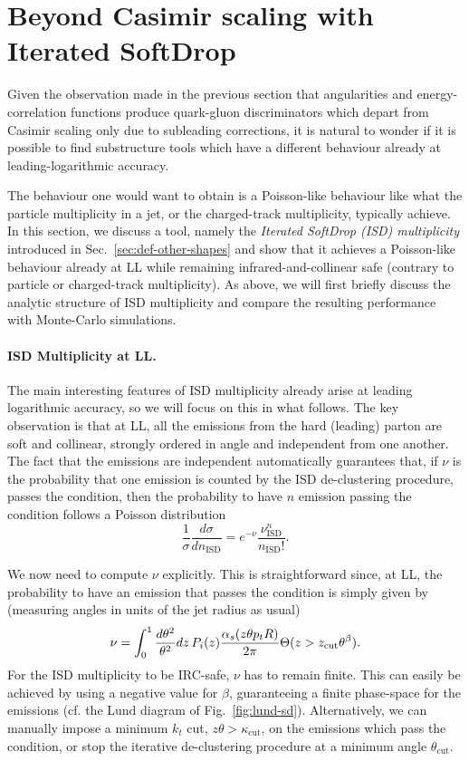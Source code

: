 \section{Beyond Casimir scaling with Iterated SoftDrop}\label{sec:isd}

Given the observation made in the previous section that angularities
and energy-cor\-relation functions produce quark-gluon discriminators
which depart from Casimir scaling only due to subleading corrections,
it is natural to wonder if it is possible to find substructure tools
which have a different behaviour already at leading-logarithmic
accuracy.

The behaviour one would want to obtain is a Poisson-like
behaviour like what the particle multiplicity in a jet, or the
charged-track multiplicity, typically achieve.
%
In this section, we discuss a tool, namely the {\em Iterated SoftDrop (ISD)
  multiplicity} introduced in Sec.~\ref{sec:def-other-shapes} and
show that it achieves a Poisson-like behaviour already at LL while
remaining infrared-and-collinear safe (contrary to particle or
charged-track multiplicity).
%
As above, we will first briefly discuss the analytic structure of ISD
multiplicity and compare the resulting performance with Monte-Carlo
simulations.

\paragraph{ISD Multiplicity at LL.}
%
The main interesting features of ISD multiplicity already arise at
leading logarithmic accuracy, so we will focus on this in what
follows.
%
The key observation is that at LL, all the emissions from the hard
(leading) parton are soft and collinear, strongly ordered in angle and
independent from one another. The fact that the emissions are
independent automatically guarantees that, if $\nu$ is the probability
that one emission is counted by the ISD de-clustering procedure, \ie
passes the \SD condition, then the probability to have $n$ emission
passing the \SD condition follows a Poisson distribution
\begin{equation}\label{eq:isd-poisson}
\frac{1}{\sigma} \frac{d\sigma}{dn_\text{ISD}} = e^{-\nu} \frac{\nu^n_\text{ISD}}{n_\text{ISD}!}.
\end{equation}

We now need to compute $\nu$ explicitly.
%
This is straightforward since, at LL, the probability to have an emission that passes the \SD condition is simply
given by (measuring angles in units of the jet radius as usual)
\begin{equation}
\nu = \int_0^1
\frac{d\theta^2}{\theta^2}dz\,P_i(z)\frac{\alpha_s(z\theta p_tR)}{2\pi} \Theta(z>z_{\text{cut}}\theta^\beta).
\end{equation}
For the ISD multiplicity to be IRC-safe, $\nu$ has to remain
finite. This can easily be achieved by using a negative value for
$\beta$, guaranteeing a finite phase-space for the emissions (cf. \eg
the Lund diagram of Fig.~\ref{fig:lund-sd}).
%
Alternatively, we can manually impose a minimum $k_t$ cut,
$z\theta>\kappa_\text{cut}$, on the emissions which pass the \SD
condition, or stop the iterative de-clustering procedure at a minimum
angle $\theta_\text{cut}$.

